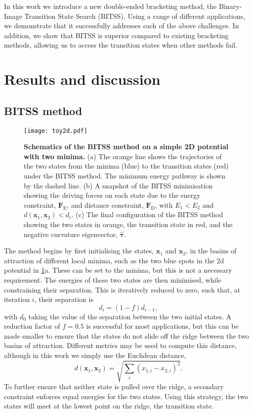 \documentclass[twocolumn,10pt]{revtex4}
\newcommand{\bm}[1]{\boldsymbol{\mathbf{#1}}}
\begin{document}
In this work we introduce a new double-ended bracketing method, the Binary-Image Transition State Search (BITSS).
Using a range of different applications, we demonstrate that it successfully addresses each of the above challenges.
In addition, we show that BITSS is superior compared to existing bracketing methods, allowing us to access the transition states when other methods fail.


\section{Results and discussion}
\subsection{BITSS method}
\begin{figure}[tb]
  \texttt{[image: toy2d.pdf]}
  \caption{\label{fig:toy2d}
    \textbf{Schematics of the BITSS method on a simple 2D potential with two minima.}
    (a) The orange line shows the trajectories of the two states from the minima (blue) to the transition states (red) under the BITSS method.
        The minimum energy pathway is shown by the dashed line.
    (b) A snapshot of the BITSS minimisation showing the driving forces on each state due to the energy constraint, $\bm{F}_\mathrm{E}$, and distance constraint, $\bm{F}_\mathrm{D}$, with $E_1 < E_2$ and $d(\bm{x}_1,\bm{x}_2) < d_i$.
    (c) The final configuration of the BITSS method showing the two states in orange, the transition state in red, and the negative curvature eigenvector, $\bm{\hat{\tau}}$.
  }
\end{figure}

The method begins by first initialising the states, $\bm{x}_1$ and $\bm{x}_2$, in the basins of attraction of different local minima, such as the two blue spots in the 2d potential in \cref{fig:toy2d}a.
These can be set to the minima, but this is not a necessary requirement.
The energies of these two states are then minimised, while constraining their separation.
This is iteratively reduced to zero, such that, at iteration $i$, their separation is
\begin{equation}\label{eq:diteration}
  d_i = (1 - f) d_{i-1},
\end{equation}
with $d_0$ taking the value of the separation between the two initial states.
A reduction factor of $f = 0.5$ is successful for most applications, but this can be made smaller to ensure that the states do not slide off the ridge between the two basins of attraction.
Different metrics may be used to compute this distance, although in this work we simply use the Euclidean distance,
\begin{equation}
  d(\bm{x}_1, \bm{x}_2) = \sqrt{\sum_i (x_{1,i} - x_{2,i})^2}.
\end{equation}
To further ensure that neither state is pulled over the ridge, a secondary constraint enforces equal energies for the two states.
Using this strategy, the two states will meet at the lowest point on the ridge, the transition state.
\end{document}
